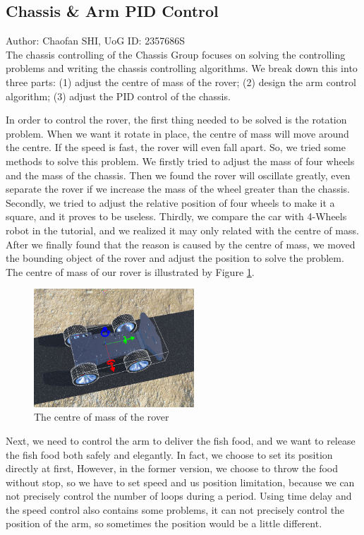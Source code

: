 \subsection{Chassis \& Arm PID Control}
Author: Chaofan SHI, UoG ID: 2357686S\\

The chassis controlling of the Chassis Group focuses on solving the controlling problems and writing the chassis controlling algorithms. We break down this into three parts: (1) adjust the centre of mass of the rover; (2) design the arm control algorithm; (3) adjust the PID control of the chassis.

In order to control the rover, the first thing needed to be solved is the rotation problem. When we want it rotate in place, the centre of mass will move around the centre. If the speed is fast, the rover will even fall apart. So, we tried some methods to solve this problem. We firstly tried to adjust the mass of four wheels and the mass of  the chassis. Then we found the rover will oscillate greatly, even separate the rover if we increase the mass of the wheel greater than the chassis. Secondly, we tried to adjust the relative position of four wheels to make it a square, and it proves to be useless. Thirdly, we compare the car with 4-Wheels robot in the tutorial\cite{tutorial_2}, and we realized it may only related with the centre of mass. After we finally found that the reason is caused by the centre of mass,  we moved the bounding object of the rover and adjust the position to solve the problem. The centre of mass of our rover is illustrated by Figure \ref{fig:centre_of_mass}.

\begin{figure}[htbp]
    \centering
    \includegraphics[width=6cm]{implementation/img_shi/centre_of_mass.png}
    \caption{The centre of mass of the rover}
    \label{fig:centre_of_mass}
\end{figure}

Next, we need to control the arm to deliver the fish food, and we want to release the fish food both safely and elegantly. In fact, we choose to set its position directly at first, However, in the former version, we choose to throw the food without stop, so we have to set speed and us position limitation, because we can not precisely control the number of loops during a period. Using time delay and the speed control also contains some problems, it can not precisely control the position of the arm, so sometimes the position would be a little different.

